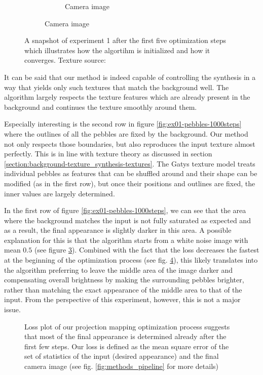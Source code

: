 \begin{figure}[]
\begin{subfigure}{\textwidth}
\begin{subfigure}{0.24\textwidth}
            \caption{Camera image}
            \label{fig:ex01-pebbles-5steps-threshold_proj}
        \end{subfigure}
    \end{subfigure}
    \caption{A snapshot of experiment 1 after the first five optimization steps which illustrates how the algortihm is initialized and how it converges. Texture source: \citet{Gatys2015}}
    \label{fig:ex01-pebbles-5steps}
\end{figure}

It can be said that our method is indeed capable of controlling the synthesis in a way that yields only such textures that match the background well. The algorithm largely respects the texture features which are already present in the background and continues the texture smoothly around them.

Especially interesting is the second row in figure \ref{fig:ex01-pebbles-1000steps} where the outlines of all the pebbles are fixed by the background. Our method not only respects those boundaries, but also reproduces the input texture almost perfectly. This is in line with texture theory as discussed in section \ref{section:background-texture_synthesis-textures}. The Gatys texture model treats individual pebbles as features that can be shuffled around and their shape can be modified (as in the first row), but once their positions and outlines are fixed, the inner values are largely determined.

In the first row of figure \ref{fig:ex01-pebbles-1000steps}, we can see that the area where the background matches the input is not fully saturated as expected and as a result, the final appearance is slightly darker in this area. A possible explanation for this is that the algorithm starts from a white noise image with mean \(0.5\) (see figure \ref{fig:ex01-pebbles-5steps}). Combined with the fact that the loss decreases the fastest at the beginning of the optimization process (see fig. \ref{fig:ex01-loss_plot}), this likely translates into the algorithm preferring to leave the middle area of the image darker and compensating overall brightness by making the surrounding pebbles brighter, rather than matching the exact appearance of the middle area to that of the input. From the perspective of this experiment, however, this is not a major issue.

\begin{figure}[ht]
    \centering
    \def\svgwidth{0.8\textwidth}
    
    \caption{Loss plot of our projection mapping optimization process suggests that most of the final appearance is determined already after the first few steps. Our loss is defined as the mean square error of the set of statistics of the input (desired appearance) and the final camera image (see fig. \ref{fig:methods_pipeline} for more details)}
    \label{fig:ex01-loss_plot}
\end{figure}

